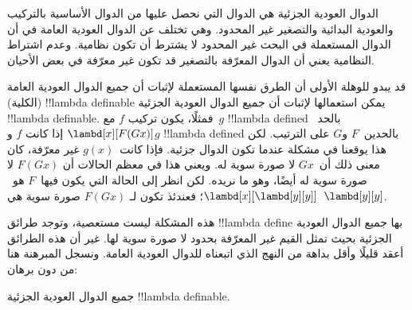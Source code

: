 \documentclass[../../../include/open-logic-section]{subfiles}
\begin{document}

الدوال العودية الجزئية هي الدوال التي نحصل عليها من الدوال الأساسية
بالتركيب والعودية البدائية والتصغير غير المحدود. وهي تختلف عن الدوال
العودية العامة في أن الدوال المستعملة في البحث غير المحدود لا يشترط
أن تكون نظامية. وعدم اشتراط النظامية يعني أن الدوال المعرّفة بالتصغير
قد تكون غير معرّفة في بعض الأحيان.

قد يبدو للوهلة الأولى أن الطرق نفسها المستعملة لإثبات أن جميع الدوال
العودية العامة (الكلية) !!{lambda definable} يمكن استعمالها لإثبات أن
جميع الدوال العودية الجزئية !!{lambda definable}. فمثلًا، يكون تركيب
$f$ مع~$g$ !!{lambda defined} بالحد~$\lambd[x][F (G x)]$ إذا كانت
$f$ و$g$ !!{lambda defined} بالحدين~$F$ و$G$ على الترتيب. لكن هذا
يوقعنا في مشكلة عندما تكون الدوال جزئية. فإذا كانت~$g(x)$ غير معرّفة،
كان معنى ذلك أن~$G x$ لا صورة سوية له. ويعني هذا في معظم الحالات أن
$F (G x)$ لا صورة سوية له أيضًا، وهو ما نريده. لكن انظر إلى الحالة
التي يكون فيها~$F$ هو~$\lambd[x][\lambd[y][y]]$؛ فعندئذ تكون لـ
$F (G x)$ صورة سوية هي~$\lambd[y][y]$.

هذه المشكلة ليست مستعصية، وتوجد طرائق !!{lambda define} بها جميع
الدوال العودية الجزئية بحيث تمثل القيم غير المعرّفة بحدود لا صورة
سوية لها. غير أن هذه الطرائق أعقد قليلًا وأقل بداهة من النهج الذي
اتبعناه للدوال العودية العامة. ونسجل المبرهنة هنا من دون برهان:

\begin{thm}
  جميع الدوال العودية الجزئية !!{lambda definable}.
\end{thm}
\end{document}
